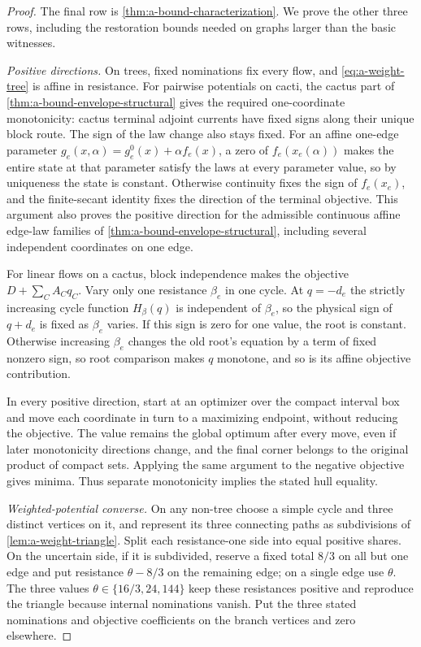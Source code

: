 \begin{proof}
The final row is \cref{thm:a-bound-characterization}. We prove the other
three rows, including the restoration bounds needed on graphs larger than
the basic witnesses.

\emph{Positive directions.}
On trees, fixed nominations fix every flow, and
\cref{eq:a-weight-tree} is affine in resistance. For pairwise potentials
on cacti, the cactus part of \cref{thm:a-bound-envelope-structural}
gives the required one-coordinate monotonicity: cactus terminal adjoint
currents have fixed signs along their unique block route. The sign of
the law change also stays fixed. For an affine one-edge parameter
$g_e(x,\alpha)=g_e^0(x)+\alpha f_e(x)$, a zero of
$f_e(x_e(\alpha))$ makes the entire state at that parameter satisfy the
laws at every parameter value, so by uniqueness the state is constant.
Otherwise continuity fixes the sign of $f_e(x_e)$, and the finite-secant
identity fixes the direction of the terminal objective. This argument
also proves the positive direction for the admissible continuous affine
edge-law families of \cref{thm:a-bound-envelope-structural}, including
several independent coordinates on one edge.

For linear flows on a cactus, block independence makes the objective
$D+\sum_C A_Cq_C$. Vary only one resistance $\beta_e$ in one cycle.
At $q=-d_e$ the strictly increasing cycle function $H_\beta(q)$ is
independent of $\beta_e$, so the physical sign of $q+d_e$ is fixed as
$\beta_e$ varies. If this sign is zero for one value, the root is
constant. Otherwise increasing $\beta_e$ changes the old root's equation
by a term of fixed nonzero sign, so root comparison makes $q$ monotone,
and so is its affine objective contribution.

In every positive direction, start at an optimizer over the compact
interval box and move each coordinate in turn to a maximizing endpoint,
without reducing the objective. The value remains the global optimum
after every move, even if later monotonicity directions change, and the
final corner belongs to the original product of compact sets. Applying
the same argument to the negative objective gives minima. Thus separate
monotonicity implies the stated hull equality.

\emph{Weighted-potential converse.}
On any non-tree choose a simple cycle and three distinct vertices on it,
and represent its three connecting paths as subdivisions of
\cref{lem:a-weight-triangle}. Split each resistance-one side into equal
positive shares. On the uncertain side, if it is subdivided, reserve a
fixed total $8/3$ on all but one edge and put resistance $\theta-8/3$ on
the remaining edge; on a single edge use $\theta$. The three values
$\theta\in\{16/3,24,144\}$ keep these resistances positive and reproduce
the triangle because internal nominations vanish. Put the three stated
nominations and objective coefficients on the branch vertices and zero
elsewhere.


\end{proof}
